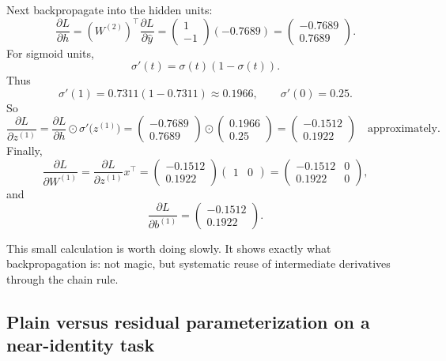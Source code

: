 Next backpropagate into the hidden units:
\[
 \frac{\partial L}{\partial h}
 =
 \left(W^{(2)}\right)^\top
 \frac{\partial L}{\partial \hat y}
 =
 \begin{pmatrix}1\\-1\end{pmatrix}(-0.7689)
 =
 \begin{pmatrix}-0.7689\\0.7689\end{pmatrix}.
\]
For sigmoid units,
\[
 \sigma'(t)=\sigma(t)(1-\sigma(t)).
\]
Thus
\[
 \sigma'(1)=0.7311(1-0.7311)\approx 0.1966,
 \qquad
 \sigma'(0)=0.25.
\]
So
\[
 \frac{\partial L}{\partial z^{(1)}}
 =
 \frac{\partial L}{\partial h}\odot \sigma'\bigl(z^{(1)}\bigr)
 =
 \begin{pmatrix}-0.7689\\0.7689\end{pmatrix}
 \odot
 \begin{pmatrix}0.1966\\0.25\end{pmatrix}
 =
 \begin{pmatrix}-0.1512\\0.1922\end{pmatrix}
 \quad\text{approximately.}
\]
Finally,
\[
 \frac{\partial L}{\partial W^{(1)}}
 =
 \frac{\partial L}{\partial z^{(1)}}x^\top
 =
 \begin{pmatrix}-0.1512\\0.1922\end{pmatrix}
 \begin{pmatrix}1 & 0\end{pmatrix}
 =
 \begin{pmatrix}
 -0.1512 & 0\\
 0.1922 & 0
 \end{pmatrix},
\]
and
\[
 \frac{\partial L}{\partial b^{(1)}}
 =
 \begin{pmatrix}-0.1512\\0.1922\end{pmatrix}.
\]

\medskip

This small calculation is worth doing slowly.
It shows exactly what backpropagation is: not magic, but systematic reuse of intermediate derivatives through the chain rule.

\subsection*{Plain versus residual parameterization on a near-identity task}


